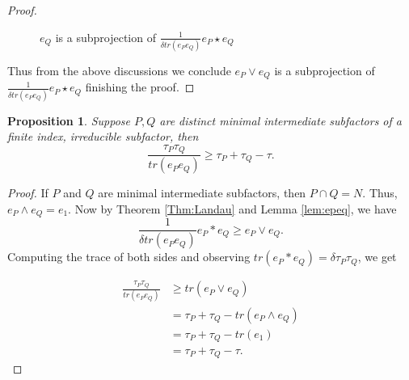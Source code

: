 \documentclass[11pt,letterpaper]{amsart}
\newtheorem{proposition}[theorem]{Proposition}
\theoremstyle{definition}
\theoremstyle{remark}
\begin{document}
\begin{proof}
\begin{figure}[H]
\caption{$e_Q$ is a subprojection of $\frac{1}{\delta tr(e_Pe_Q)}e_P\star e_Q$}
	\label{qe1}
\end{figure}

Thus from the above discussions we conclude $e_P \vee e_Q$ is a subprojection of $\frac{1}{\delta tr(e_Pe_Q)}e_P\star e_Q$ finishing the proof.
\end{proof} 
\begin{proposition}
\label{mini}
Suppose $P,Q$ are distinct minimal intermediate subfactors of a finite index, irreducible subfactor, then 
	\begin{equation}
	\frac{\tau_P\tau_Q}{tr(e_Pe_Q)}\geq \tau_P+\tau_Q-\tau. \label{Equ:keyineq}
	\end{equation}
\end{proposition}
\begin{proof}
	If $P$ and $Q$ are minimal intermediate subfactors, then $P\cap Q=N$. Thus, $e_P\wedge e_Q= e_1.$  Now by Theorem \ref{Thm:Landau} and  Lemma \ref{lem:epeq}, we have 
	\begin{equation*}
	\frac{1}{\delta tr(e_Pe_Q)}e_P * e_Q\geq e_P\vee e_Q.
	\end{equation*}
	Computing the trace of both sides and observing $tr(e_P  *  e_Q)= \delta \tau_P\tau_Q$, we get
	
	\begin{align*}
	\frac{\tau_P\tau_Q}{tr(e_Pe_Q)}&\geq tr(e_P\vee e_Q)\\ 
	&=\tau_P+\tau_Q-tr(e_P\wedge e_Q)\\
	&=\tau_P+\tau_Q-tr(e_1)\\
	&=\tau_P+\tau_Q-\tau.
	\end{align*}
\end{proof}
\end{document}
